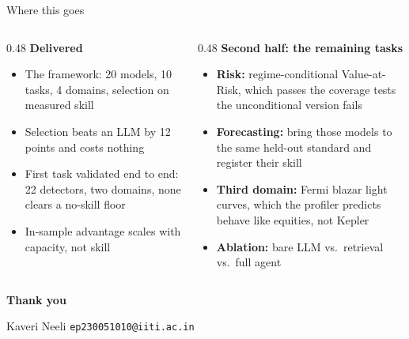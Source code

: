 \documentclass[aspectratio=169,10pt]{beamer}
\begin{document}
\begin{frame}{Where this goes}
  \begin{columns}[T]
    \begin{column}{0.48\textwidth}
      \textbf{Delivered}
      \vspace{0.4em}
      \small
      \begin{itemize}
        \item The framework: 20 models, 10 tasks, 4 domains, selection on
              measured skill
        \item Selection beats an LLM by 12 points and costs nothing
        \item First task validated end to end: 22 detectors, two domains,
              none clears a no-skill floor
        \item In-sample advantage scales with capacity, not skill
      \end{itemize}
    \end{column}
    \begin{column}{0.48\textwidth}
      \textbf{Second half: the remaining tasks}
      \vspace{0.4em}
      \small
      \begin{itemize}
        \item \textbf{Risk:} regime-conditional Value-at-Risk, which passes the
              coverage tests the unconditional version fails
        \item \textbf{Forecasting:} bring those models to the same held-out
              standard and register their skill
        \item \textbf{Third domain:} Fermi blazar light curves, which the
              profiler predicts behave like equities, not Kepler
        \item \textbf{Ablation:} bare LLM vs.\ retrieval vs.\ full agent
      \end{itemize}
    \end{column}
  \end{columns}
\end{frame}

\appendix
\begin{frame}[plain]
  \centering
  \vspace{2em}
  {\Large \textbf{Thank you}}

  \vspace{1em}
  \small Kaveri Neeli \textbar{} \texttt{ep230051010@iiti.ac.in}
\end{frame}
\end{document}
